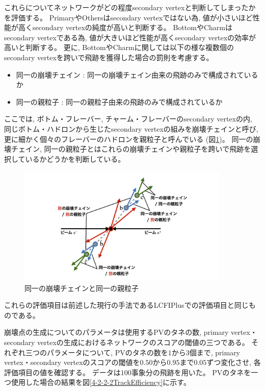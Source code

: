 これらについてネットワークがどの程度secondary vertexと判断してしまったかを評価する。
PrimaryやOthersはsecondary vertexではない為, 値が小さいほど性能が高くsecondary vertexの純度が高いと判断する。
BottomやCharmはsecondary vertexである為, 値が大きいほど性能が高くsecondary vertexの効率が高いと判断する。
更に, BottomやCharmに関しては以下の様な複数個のsecondary vertexを跨いで飛跡を獲得した場合の罰則を考慮する。

\begin{itemize}
 \item 同一の崩壊チェイン : 同一の崩壊チェイン由来の飛跡のみで構成されているか
 \item 同一の親粒子 : 同一の親粒子由来の飛跡のみで構成されているか
\end{itemize}

ここでは, ボトム・フレーバー, チャーム・フレーバーのsecondary vertexの内, 同じボトム・ハドロンから生じたsecondary vertexの組みを崩壊チェインと呼び, 更に細かく個々のフレーバーのハドロンを親粒子と呼んでいる (図\ref{4-2-2-1SameChainSameParticle})。
同一の崩壊チェイン, 同一の親粒子とはこれらの崩壊チェインや親粒子を跨いで飛跡を選択しているかどうかを判断している。

\begin{figure}[htbp]
 \centering
 \includegraphics[width=0.9\textwidth, clip]{Figure/4VertexFinderwithDL/4-2-2-1SameChainSameParticle.png}
 \caption[同一の崩壊チェインと同一の親粒子]{同一の崩壊チェインと同一の親粒子}
 \label{4-2-2-1SameChainSameParticle}
\end{figure}

これらの評価項目は前述した現行の手法であるLCFIPlusでの評価項目と同じものである。

崩壊点の生成についてのパラメータは使用するPVのタネの数, primary vertex・secondary vertexの生成におけるネットワークのスコアの閾値の三つである。
それぞれ三つのパラメータについて, PVのタネの数を$1$から$3$個まで, primary vertex・secondary vertexのスコアの閾値を$0.50$から$0.95$まで$0.05$ずつ変化させ, 各評価項目の値を確認する。
データは$100$事象分の飛跡を用いた。
PVのタネを一つ使用した場合の結果を図\ref{4-2-2-2TrackEfficiency}に示す。

